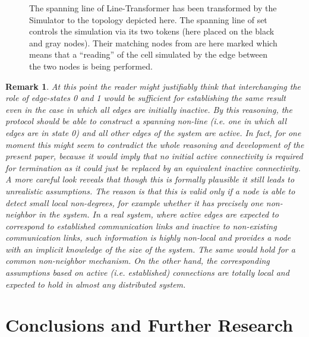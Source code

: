 \documentclass[preprint]{elsarticle}
\newtheorem{remark}{Remark}
\begin{document}
\begin{figure}[!hbtp]
\caption{The spanning line of Line-Transformer has been transformed by the Simulator to the topology depicted here. The spanning line of set  controls the simulation via its two tokens (here placed on the black and gray nodes). Their matching nodes from  are here marked  which means that a ``reading'' of the cell simulated by the edge between the two nodes is being performed.} \label{fig:simulator}
\end{figure}

\begin{remark}
At this point the reader might justifiably think that interchanging the role of edge-states 0 and 1 would be sufficient for establishing the same result even in the case in which all edges are initially inactive. By this reasoning, the protocol should be able to construct a spanning \emph{non-line} (i.e. one in which all edges are in state 0) and all other edges of the system are active. In fact, for one moment this might seem to contradict the whole reasoning and development of the present paper, because it would imply that no initial active connectivity is required for termination as it could just be replaced by an equivalent inactive connectivity. A more careful look reveals that though this is formally plausible it still leads to unrealistic assumptions. The reason is that this is valid only if a node is able to detect small local \emph{non-degrees}, for example whether it has precisely one \emph{non-neighbor} in the system. In a real system, where active edges are expected to correspond to established communication links and inactive to non-existing communication links, such information is \emph{highly non-local} and provides a node with an \emph{implicit knowledge of the size of the system}. The same would hold for a common non-neighbor mechanism. On the other hand, the corresponding assumptions based on active (i.e. established) connections are totally local and expected to hold in almost any distributed system.
\end{remark}

\section{Conclusions and Further Research}
\label{sec:conclusions}
\end{document}
